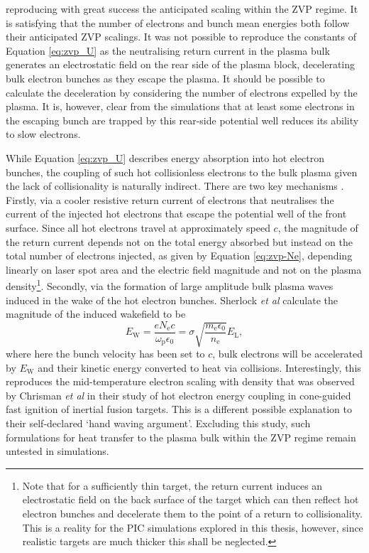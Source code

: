 reproducing with great success the anticipated scaling within the ZVP regime. It is satisfying that the number of electrons and bunch mean energies both follow their anticipated ZVP scalings. It was not possible to reproduce the constants of Equation \ref{eq:zvp_U} as the neutralising return current in the plasma bulk generates an electrostatic field on the rear side of the plasma block, decelerating bulk electron bunches as they escape the plasma. It should be possible to calculate the deceleration by considering the number of electrons expelled by the plasma. It is, however, clear from the simulations that at least some electrons in the escaping bunch are trapped by this rear-side potential well reduces its ability to slow electrons.

While Equation \ref{eq:zvp_U} describes energy absorption into hot electron bunches, the coupling of such hot collisionless electrons to the bulk plasma given the lack of collisionality is naturally indirect. There are two key mechanisms \cite{sherlockIndepthPlasmawaveHeating2014}. Firstly, via a cooler resistive return current of electrons that neutralises the current of the injected hot electrons that escape the potential well of the front surface. Since all hot electrons travel at approximately speed $c$, the magnitude of the return current depends not on the total energy absorbed but instead on the total number of electrons injected, as given by Equation \ref{eq:zvp-Ne}, depending linearly on laser spot area and the electric field magnitude and not on the plasma density\footnote{Note that for a sufficiently thin target, the return current induces an electrostatic field on the back surface of the target which can then reflect hot electron bunches and decelerate them to the point of a return to collisionality. This is a reality for the PIC simulations explored in this thesis, however, since realistic targets are much thicker this shall be neglected.}. Secondly, via the formation of large amplitude bulk plasma waves induced in the wake of the hot electron bunches. Sherlock \textit{et al} \cite{sherlockIndepthPlasmawaveHeating2014} calculate the magnitude of the induced wakefield to be
\begin{equation}
	E_\mathrm{W} = \frac{eN_\mathrm{e}c}{\omega_\mathrm{p}\epsilon_0} = \sigma \sqrt{\frac{m_\mathrm{e}\epsilon_0}{n_\mathrm{e}}}E_\mathrm{L},
\end{equation}where here the bunch velocity has been set to $c$, bulk electrons will be accelerated by $E_\mathrm{W}$ and their kinetic energy converted to heat via collisions. Interestingly, this reproduces the mid-temperature electron scaling with density that was observed by Chrisman \textit{et al} \cite{chrismanIntensityScalingHot2008} in their study of hot electron energy coupling in cone-guided fast ignition of inertial fusion targets. This is a different possible explanation to their self-declared `hand waving argument'. Excluding this study, such formulations for heat transfer to the plasma bulk within the ZVP regime remain untested in simulations.

